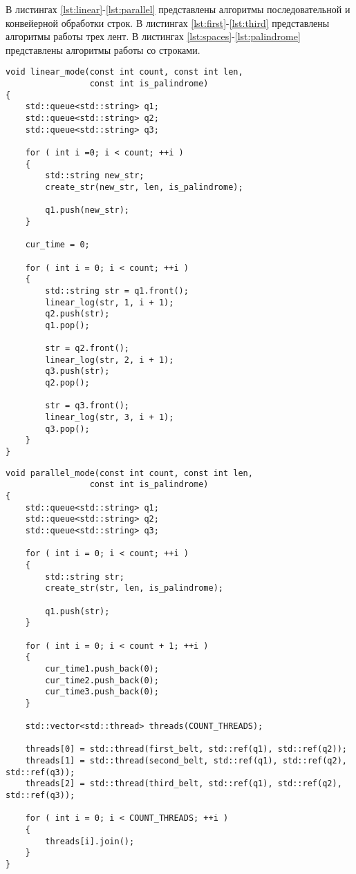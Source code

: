 В листингах \ref{lst:linear}-\ref{lst:parallel} представлены алгоритмы последовательной и конвейерной обработки строк. В листингах \ref{lst:first}-\ref{lst:third} представлены алгоритмы работы трех лент. В листингах \ref{lst:spaces}-\ref{lst:palindrome} представлены алгоритмы работы со строками.
\clearpage
\begin{center}
    \captionsetup{justification=raggedright,singlelinecheck=off}
    \begin{lstlisting}[label=lst:linear,caption=Последовательная обработка]
void linear_mode(const int count, const int len,
                 const int is_palindrome)
{
    std::queue<std::string> q1;
    std::queue<std::string> q2;
    std::queue<std::string> q3;

    for ( int i =0; i < count; ++i )
    {
        std::string new_str;
        create_str(new_str, len, is_palindrome);

        q1.push(new_str);
    }

    cur_time = 0;

    for ( int i = 0; i < count; ++i )
    {
        std::string str = q1.front();
        linear_log(str, 1, i + 1);
        q2.push(str);
        q1.pop();

        str = q2.front();
        linear_log(str, 2, i + 1);
        q3.push(str);
        q2.pop();

        str = q3.front();
        linear_log(str, 3, i + 1);
        q3.pop();
    }
}
\end{lstlisting}
\end{center}
\clearpage
\begin{center}
    \captionsetup{justification=raggedright,singlelinecheck=off}
    \begin{lstlisting}[label=lst:parallel,caption=Конвейерная обработка]
void parallel_mode(const int count, const int len,
                 const int is_palindrome)
{
    std::queue<std::string> q1;
    std::queue<std::string> q2;
    std::queue<std::string> q3;

    for ( int i = 0; i < count; ++i )
    {
        std::string str;
        create_str(str, len, is_palindrome);

        q1.push(str);
    }
    
    for ( int i = 0; i < count + 1; ++i )
    {
        cur_time1.push_back(0);
        cur_time2.push_back(0);
        cur_time3.push_back(0);
    }

    std::vector<std::thread> threads(COUNT_THREADS);

    threads[0] = std::thread(first_belt, std::ref(q1), std::ref(q2));
    threads[1] = std::thread(second_belt, std::ref(q1), std::ref(q2), std::ref(q3));
    threads[2] = std::thread(third_belt, std::ref(q1), std::ref(q2), std::ref(q3));

    for ( int i = 0; i < COUNT_THREADS; ++i )
    {
        threads[i].join();
    }
}
\end{lstlisting}
\end{center}
